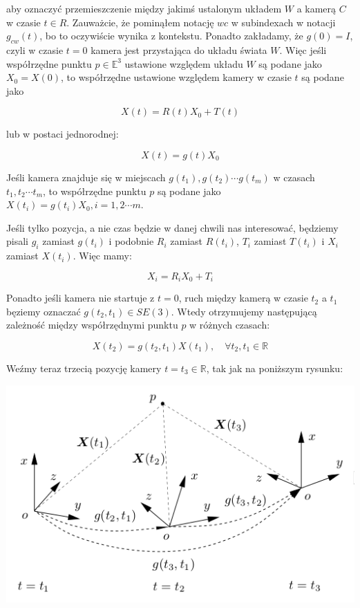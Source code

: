 \documentclass[a4paper,12pt]{article}
\newcommand{\E}{\mathbb{E}}
\newcommand{\R}{\mathbb{R}}
\begin{document}
\noindent aby oznaczyć przemieszczenie między jakimś ustalonym układem $W$ a kamerą $C$ w czasie $t \in R$. Zauważcie, że pominąłem notację $wc$ w subindexach w notacji $g_{cw}(t)$, bo to oczywiście wynika z kontekstu. Ponadto zakładamy, że $g(0)=I$, czyli w czasie $t=0$ kamera jest przystająca do układu świata $W$. Więc jeśli współrzędne punktu $p \in \E^3$ ustawione względem układu $W$ są podane jako $X_0 = X(0)$, to współrzędne ustawione względem kamery w czasie $t$ są podane jako

\begin{equation}
X(t)=R(t)X_0 + T(t)
\end{equation}

\noindent lub w postaci jednorodnej:

\begin{equation}
X(t)=g(t)X_0
\end{equation}

Jeśli kamera znajduje się w miejscach $g(t_1), g(t_2) \cdots g(t_m)$ w czasach $t_1,t_2 \cdots t_m$, to współrzędne punktu $p$ są podane jako $X(t_i)=g(t_i)X_0,i=1,2 \cdots m$.

Jeśli tylko pozycja, a nie czas będzie w danej chwili nas interesować, będziemy pisali $g_i$ zamiast $g(t_i)$ i podobnie $R_i$ zamiast $R(t_i)$, $T_i$ zamiast $T(t_i)$ i $X_i$ zamiast $X(t_i)$. Więc mamy:

\begin{equation}
X_i = R_iX_0 + T_i
\end{equation}

Ponadto jeśli kamera nie startuje z $t=0$, ruch między kamerą w czasie $t_2$ a $t_1$ bęziemy oznaczać $g(t_2,t_1) \in SE(3)$. Wtedy otrzymujemy następującą zależność między współrzędnymi punktu $p$ w różnych czasach:

\begin{equation}
X(t_2)=g(t_2,t_1)X(t_1), \quad \forall t_2,t_1 \in \R
\end{equation}

Weźmy teraz trzecią pozycję kamery $t = t_3 \in \R$, tak jak na poniższym rysunku:

\begin{center}
\includegraphics[scale=0.5]{img/rys3.png}
\end{center}
\end{document}
